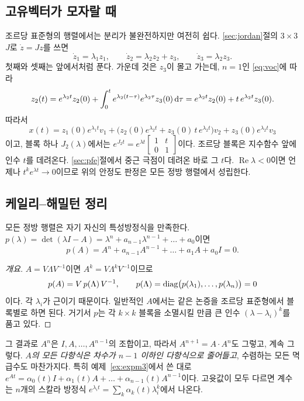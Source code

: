 \documentclass[11pt]{article}
\begin{document}
\subsection{고유벡터가 모자랄 때}\label{sec:jordanresp}
조르당 표준형의 행렬에서는 분리가 불완전하지만 여전히 쉽다. \ref{sec:jordan}절의
$3\times3$ $J$로 $\dot z=Jz$를 쓰면
\[
   \dot z_1=\lambda_1z_1,\qquad \dot z_2=\lambda_2z_2+z_3,\qquad \dot z_3=\lambda_2z_3 .
\]
첫째와 셋째는 앞에서처럼 푼다. 가운데 것은 $z_3$이 몰고 가는데, $n=1$인
\eqref{eq:voc}에 따라
\[
   z_2(t) = e^{\lambda_2t}z_2(0)+\int_0^{t}e^{\lambda_2(t-\tau)}e^{\lambda_2\tau}z_3(0)\,\mathrm{d}\tau
          = e^{\lambda_2t}z_2(0) + t\,e^{\lambda_2t}z_3(0).
\]
따라서
\[
   x(t) = z_1(0)e^{\lambda_1t}v_1 + \bigl(z_2(0)e^{\lambda_2t}+z_3(0)\,t\,e^{\lambda_2t}\bigr)v_2
          + z_3(0)e^{\lambda_2t}v_3
\]
이고, 블록 하나 $J_2(\lambda)$에서는 $e^{J_2t}=e^{\lambda t}\begin{bmatrix}1&t\\0&1\end{bmatrix}$이다.
조르당 블록은 지수함수 앞에 인수 $t$를 데려온다. \ref{sec:pfe}절에서 중근 극점이
데려온 바로 그 $t$다. $\operatorname{Re}\lambda<0$이면 언제나
$t^{k}e^{\lambda t}\to0$이므로 위의 안정도 판정은 모든 정방 행렬에서 성립한다.

\subsection{케일리--해밀턴 정리}\label{sec:cayley}
\begin{theorem}
모든 정방 행렬은 자기 자신의 특성방정식을 만족한다.
$p(\lambda)=\det(\lambda I-A)=\lambda^{n}+a_{n-1}\lambda^{n-1}+\dots+a_0$이면
\[
   p(A) = A^{n}+a_{n-1}A^{n-1}+\dots+a_1A+a_0I = 0 .
\]
\end{theorem}
\begin{proof}[개요]
$A=V\Lambda V^{-1}$이면 $A^{k}=V\Lambda^{k}V^{-1}$이므로
\[
   p(A)=V\,p(\Lambda)\,V^{-1},\qquad
   p(\Lambda)=\operatorname{diag}\bigl(p(\lambda_1),\dots,p(\lambda_n)\bigr)=0
\]
이다. 각 $\lambda_i$가 근이기 때문이다. 일반적인 $A$에서는 같은 논증을 조르당
표준형에서 블록별로 하면 된다. 거기서 $p$는 각 $k\times k$ 블록을 소멸시킬 만큼 큰
인수 $(\lambda-\lambda_i)^{k}$를 품고 있다.
\end{proof}
그 결과로 $A^{n}$은 $I,A,\dots,A^{n-1}$의 조합이고, 따라서 $A^{n+1}=A\cdot A^{n}$도
그렇고, 계속 그렇다. \emph{$A$의 모든 다항식은 차수가 $n-1$ 이하인 다항식으로
줄어들고}, 수렴하는 모든 멱급수도 마찬가지다. 특히 예제~\ref{ex:expm3}에서 쓴 대로
$e^{At}=\alpha_0(t)I+\alpha_1(t)A+\dots+\alpha_{n-1}(t)A^{n-1}$이다. 고윳값이 모두
다르면 계수는 $n$개의 스칼라 방정식 $e^{\lambda_it}=\sum_k\alpha_k(t)\lambda_i^{k}$에서
나온다.
\end{document}
